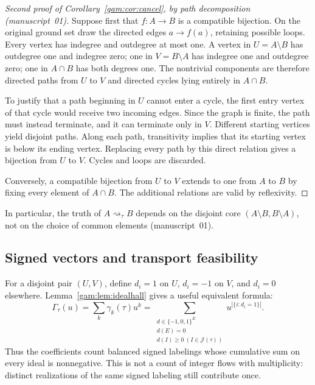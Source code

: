 \documentclass[11pt]{article}
\numberwithin{equation}{section}
\theoremstyle{definition}
\newcommand{\J}{\mathcal J(\tau)}
\newcommand{\match}{\rightsquigarrow}
\begin{document}
\begin{proof}[Second proof of Corollary~\ref{gam:cor:cancel}, by path decomposition (manuscript~01)]
Suppose first that $f:A\to B$ is a compatible bijection. On the original
ground set draw the directed edges $a\to f(a)$, retaining possible loops.
Every vertex has indegree and outdegree at most one. A vertex in
$U=A\setminus B$ has outdegree one and indegree zero; one in
$V=B\setminus A$ has indegree one and outdegree zero; one in $A\cap B$ has
both degrees one. The nontrivial components are therefore directed paths
from $U$ to $V$ and directed cycles lying entirely in $A\cap B$.

To justify that a path beginning in $U$ cannot enter a cycle, the first entry
vertex of that cycle would receive two incoming edges. Since the graph is
finite, the path must instead terminate, and it can terminate only in $V$.
Different starting vertices yield disjoint paths. Along each path,
transitivity implies that its starting vertex is below its ending vertex.
Replacing every path by this direct relation gives a bijection from $U$ to
$V$. Cycles and loops are discarded.

Conversely, a compatible bijection from $U$ to $V$ extends to one from $A$
to $B$ by fixing every element of $A\cap B$. The additional relations are
valid by reflexivity.
\end{proof}
In particular, the truth of $A\match_\tau B$ depends on the disjoint core
$(A\setminus B,B\setminus A)$, not on the choice of common elements
(manuscript~01).

\subsection{Signed vectors and transport feasibility}
For a disjoint pair $(U,V)$, define $d_i=1$ on $U$, $d_i=-1$ on $V$, and
$d_i=0$ elsewhere. Lemma~\ref{gam:lem:idealhall} gives a useful equivalent
formula:
\begin{equation}
 \Gamma_\tau(u)=\sum_k\gamma_k(\tau)u^k
  =\sum_{\substack{d\in\{-1,0,1\}^{E}\\d(E)=0\\
                          d(I)\ge0\ (I\in\J)}}
                      u^{|\{i:d_i=1\}|}.
 \label{gam:eq:signed}
\end{equation}
Thus the coefficients count balanced signed labelings whose cumulative sum
on every ideal is nonnegative. This is not a count of integer flows with
multiplicity: distinct realizations of the same signed labeling still
contribute once.
\end{document}
